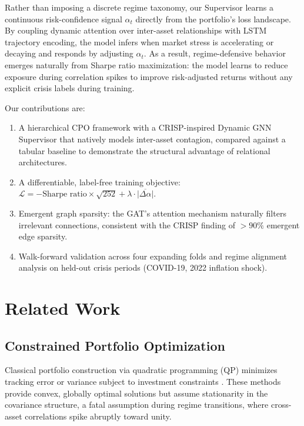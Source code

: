 \documentclass[conferences]{IEEEtran}
\begin{document}
Rather than imposing a discrete regime taxonomy, our Supervisor learns a continuous risk-confidence signal $\alpha_t$ directly from the portfolio's loss landscape. By coupling dynamic attention over inter-asset relationships with LSTM trajectory encoding, the model infers when market stress is accelerating or decaying and responds by adjusting $\alpha_t$. As a result, regime-defensive behavior emerges naturally from Sharpe ratio maximization: the model learns to reduce exposure during correlation spikes to improve risk-adjusted returns without any explicit crisis labels during training.

Our contributions are:
\begin{enumerate}
    \item A hierarchical CPO framework with a CRISP-inspired Dynamic GNN Supervisor that natively models inter-asset contagion, compared against a tabular baseline to demonstrate the structural advantage of relational architectures.
    \item A differentiable, label-free training objective: $\mathcal{L} = -\text{Sharpe ratio} \times \sqrt{252} + \lambda \cdot \overline{|\Delta\alpha|}$.
    \item Emergent graph sparsity: the GAT's attention mechanism naturally filters irrelevant connections, consistent with the CRISP finding of $>90\%$ emergent edge sparsity.
    \item Walk-forward validation across four expanding folds and regime alignment analysis on held-out crisis periods (COVID-19, 2022 inflation shock).
\end{enumerate}


\section{Related Work}

\subsection{Constrained Portfolio Optimization}
Classical portfolio construction via quadratic programming (QP) minimizes tracking error or variance subject to investment constraints \cite{markowitz1952, xie2010}. These methods provide convex, globally optimal solutions but assume stationarity in the covariance structure, a fatal assumption during regime transitions, where cross-asset correlations spike abruptly toward unity.
\end{document}
